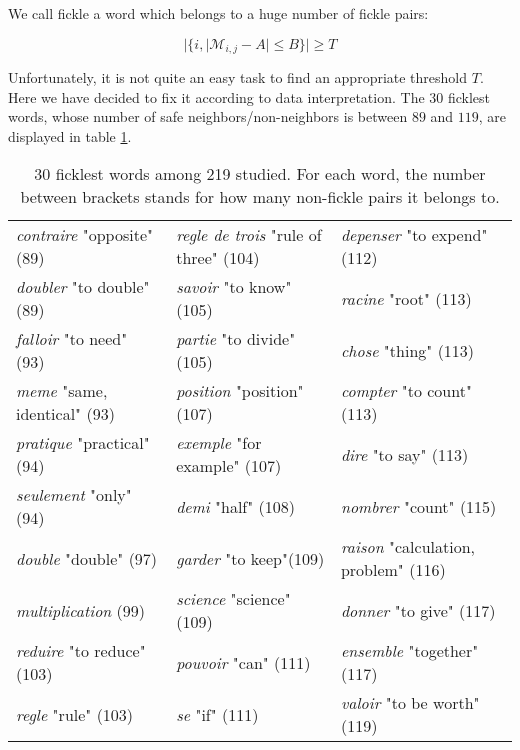 \documentclass[preprint]{elsarticle}
\begin{document}
We call fickle a word which belongs to a huge number of fickle pairs:

$$|\{i,|\mathcal{M}_{i,j}-A| \leq B \}| \geq T$$

Unfortunately, it is not quite an easy task to find an appropriate threshold $T$. Here we have decided to fix it according to data interpretation. The $30$ ficklest words, whose number of safe neighbors/non-neighbors is between $89$ and $119$, are displayed in table \ref{tab:ficklest}.

\begin{center}
\begin{table}
\begin{small}
\begin{tabular}{|lll|}
\hline
\textit{contraire} "opposite" (89) & \textit{regle de trois} "rule of three" (104) & \textit{depenser} "to expend" (112) \\
\textit{doubler} "to double" (89) & \textit{savoir}  "to know" (105) & \textit{racine} "root" (113) \\
\textit{falloir} "to need" (93) & \textit{partie} "to divide" (105) & \textit{chose} "thing" (113) \\
\textit{meme} "same, identical" (93) &  \textit{position} "position" (107) & \textit{compter} "to count" (113) \\
\textit{pratique} "practical" (94) &  \textit{exemple} "for example" (107) & \textit{dire} "to say" (113) \\
\textit{seulement}  "only" (94) &  \textit{demi} "half"  (108) & \textit{nombrer} "count" (115) \\
\textit{double} "double" (97) &  \textit{garder} "to keep"(109) & \textit{raison} "calculation, problem" (116) \\
\textit{multiplication} (99) &  \textit{science} "science" (109) & \textit{donner} "to give" (117) \\
\textit{reduire} "to reduce" (103) & \textit{pouvoir} "can" (111) & \textit{ensemble} "together" (117) \\
\textit{regle} "rule" (103) & \textit{se} "if" (111) & \textit{valoir} "to be worth" (119)\\
\hline
\end{tabular}

\end{small}
\caption{30 ficklest words among 219 studied. For each word, the number between brackets stands for how many non-fickle pairs it belongs to.}
\label{tab:ficklest}
\end{table}
\end{center}
\end{document}
